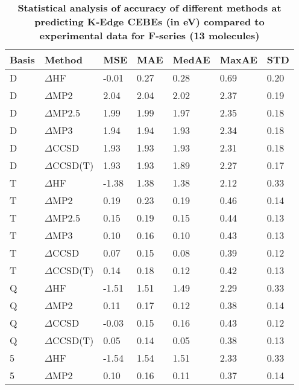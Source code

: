 \begin{table}
  \caption{\textbf{Statistical analysis of accuracy of different methods at predicting K-Edge CEBEs (in eV) compared to experimental data for F-series (13 molecules)}}
  \label{tbl:method-summary-f}
  \begin{tabular}{l l l l l l l }
    \hline
    \textbf{Basis} & \textbf{Method} & \textbf{MSE} & \textbf{MAE} & \textbf{MedAE} & \textbf{MaxAE} & \textbf{STD} \\ 
    \hline
    D & $\Delta$HF & -0.01 & 0.27 & 0.28 & 0.69 & 0.20 \\ 
    D & $\Delta$MP2 & 2.04 & 2.04 & 2.02 & 2.37 & 0.19 \\ 
    D & $\Delta$MP2.5 & 1.99 & 1.99 & 1.97 & 2.35 & 0.18 \\ 
    D & $\Delta$MP3 & 1.94 & 1.94 & 1.93 & 2.34 & 0.18 \\ 
    D & $\Delta$CCSD & 1.93 & 1.93 & 1.93 & 2.31 & 0.18 \\ 
    D & $\Delta$CCSD(T) & 1.93 & 1.93 & 1.89 & 2.27 & 0.17 \\ 
    T & $\Delta$HF & -1.38 & 1.38 & 1.38 & 2.12 & 0.33 \\ 
    T & $\Delta$MP2 & 0.19 & 0.23 & 0.19 & 0.46 & 0.14 \\ 
    T & $\Delta$MP2.5 & 0.15 & 0.19 & 0.15 & 0.44 & 0.13 \\ 
    T & $\Delta$MP3 & 0.10 & 0.16 & 0.10 & 0.43 & 0.13 \\ 
    T & $\Delta$CCSD & 0.07 & 0.15 & 0.08 & 0.39 & 0.12 \\ 
    T & $\Delta$CCSD(T) & 0.14 & 0.18 & 0.12 & 0.42 & 0.13 \\ 
    Q & $\Delta$HF & -1.51 & 1.51 & 1.49 & 2.29 & 0.33 \\ 
    Q & $\Delta$MP2 & 0.11 & 0.17 & 0.12 & 0.38 & 0.14 \\ 
    Q & $\Delta$CCSD & -0.03 & 0.15 & 0.16 & 0.43 & 0.12 \\ 
    Q & $\Delta$CCSD(T) & 0.05 & 0.14 & 0.05 & 0.38 & 0.13 \\ 
    5 & $\Delta$HF & -1.54 & 1.54 & 1.51 & 2.33 & 0.33 \\ 
    5 & $\Delta$MP2 & 0.10 & 0.16 & 0.11 & 0.37 & 0.14 \\ 
    \hline
  \end{tabular}
\end{table}
